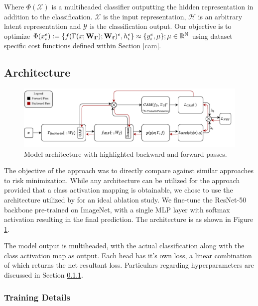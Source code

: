 \documentclass{article} %
\begin{document}
Where $\Phi(\mathcal{X})$ is a multiheaded classifier outputting the hidden representation in addition to the classification. $\mathcal{X}$ is the input representation, $\mathcal{H}$ is an arbitrary latent representation and $\mathcal{Y}$ is the classification output. Our objective is to optimize $\Phi(x_i^e) := \{f(\Gamma(x;{\bf W_\Gamma});{\bf{W_f}})^e, h_i^e\} \approx \{y_i^e, \mu\}; \mu \in \mathbb{R}^\mathbb{N}$ using dataset specific cost functions defined within Section \ref{cam}.

\subsection{Architecture}

\begin{figure}[t]
	\includegraphics[width=\textwidth]{figs/architecture}
	\caption{Model architecture with highlighted backward and forward passes.}
	\label{arch}
\end{figure}

The objective of the approach was to directly compare against similar approaches to risk minimization. While any architecture can be utilized for the approach provided that a class activation mapping is obtainable, we chose to use the architecture utilized by \citep{liu2021just} for an ideal ablation study. We fine-tune the ResNet-50 backbone pre-trained on ImageNet, with a single MLP layer with softmax activation resulting in the final prediction. The architecture is as shown in Figure \ref{arch}.

The model output is multiheaded, with the actual classification along with the class activation map as output. Each head has it's own loss, a linear combination of which returns the net resultant loss. Particulars regarding hyperparameters are discussed in Section \ref{hyperparams}.

\subsubsection{Training Details}
\label{hyperparams}
\end{document}
